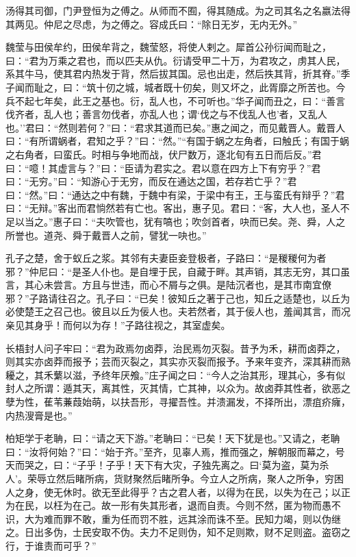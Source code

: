 \documentclass[]{article}
\begin{document}
汤得其司御，门尹登恒为之傅之。从师而不囿，得其随成。为之司其名之名嬴法得其两见。仲尼之尽虑，为之傅之。容成氏曰：``除日无岁，无内无外。''

魏莹与田侯牟约，田侯牟背之，魏莹怒，将使人剌之。犀首公孙衍闻而耻之，曰：``君为万乘之君也，而以匹夫从仇。衍请受甲二十万，为君攻之，虏其人民，系其牛马，使其君内热发于背，然后拔其国。忌也出走，然后抶其背，折其脊。''季子闻而耻之，曰：``筑十仞之城，城者既十仞矣，则又坏之，此胥靡之所苦也。今兵不起七年矣，此王之基也。衍，乱人也，不可听也。''华子闻而丑之，曰：``善言伐齐者，乱人也；善言勿伐者，亦乱人也；谓`伐之与不伐乱人也'者，又乱人也。''君曰：``然则若何？''曰：``君求其道而已矣。''惠之闻之，而见戴晋人。戴晋人曰：``有所谓蜗者，君知之乎？''曰：``然。''``有国于蜗之左角者，曰触氏；有国于蜗之右角者，曰蛮氏。时相与争地而战，伏尸数万，逐北旬有五日而后反。''君曰：``噫！其虚言与？''曰：``臣请为君实之。君以意在四方上下有穷乎？''君曰：``无穷。''曰：``知游心于无穷，而反在通达之国，若存若亡乎？''君曰：``然。''曰：``通达之中有魏，于魏中有梁，于梁中有王，王与蛮氏有辩乎？''君曰：``无辩。''客出而君惝然若有亡也。客出，惠子见。君曰：``客，大人也，圣人不足以当之。''惠子曰：``夫吹管也，犹有嗃也；吹剑首者，吷而已矣。尧、舜，人之所誉也。道尧、舜于戴晋人之前，譬犹一吷也。''

孔子之楚，舍于蚁丘之浆。其邻有夫妻臣妾登极者，子路曰：``是稯稯何为者邪？''仲尼曰：``是圣人仆也。是自埋于民，自藏于畔。其声销，其志无穷，其口虽言，其心未尝言。方且与世违，而心不屑与之俱。是陆沉者也，是其市南宜僚邪？''子路请往召之。孔子曰：``已矣！彼知丘之著于己也，知丘之适楚也，以丘为必使楚王之召己也。彼且以丘为佞人也。夫若然者，其于佞人也，羞闻其言，而况亲见其身乎！而何以为存！''子路往视之，其室虚矣。

长梧封人问子牢曰：``君为政焉勿卤莽，治民焉勿灭裂。昔予为禾，耕而卤莽之，则其实亦卤莽而报予；芸而灭裂之，其实亦灭裂而报予。予来年变齐，深其耕而熟耰之，其禾蘩以滋，予终年厌飧。''庄子闻之曰：``今人之治其形，理其心，多有似封人之所谓：遁其天，离其性，灭其情，亡其神，以众为。故卤莽其性者，欲恶之孽为性，萑苇蒹葭始萌，以扶吾形，寻擢吾性。并溃漏发，不择所出，漂疽疥癕，内热溲膏是也。''

柏矩学于老聃，曰：``请之天下游。''老聃曰：``已矣！天下犹是也。''又请之，老聃曰：``汝将何始？''曰：``始于齐。''至齐，见辜人焉，推而强之，解朝服而幕之，号天而哭之，曰：``子乎！子乎！天下有大灾，子独先离之。曰`莫为盗，莫为杀人'。荣辱立然后睹所病，货财聚然后睹所争。今立人之所病，聚人之所争，穷困人之身，使无休时。欲无至此得乎？古之君人者，以得为在民，以失为在己；以正为在民，以枉为在己。故一形有失其形者，退而自责。今则不然，匿为物而愚不识，大为难而罪不敢，重为任而罚不胜，远其涂而诛不至。民知力竭，则以伪继之。日出多伪，士民安取不伪。夫力不足则伪，知不足则欺，财不足则盗。盗窃之行，于谁责而可乎？''
\end{document}
